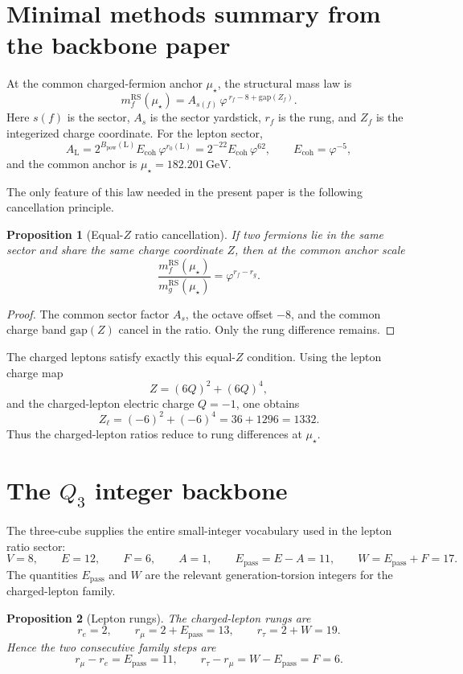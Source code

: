 \documentclass[11pt]{article}
\newtheorem{proposition}{Proposition}
\newcommand{\phig}{\varphi}
\newcommand{\mustar}{\mu_\star}
\newcommand{\Ecoh}{E_{\mathrm{coh}}}
\newcommand{\Epass}{E_{\mathrm{pass}}}
\newcommand{\Bpow}{B_{\mathrm{pow}}}
\begin{document}
\section{Minimal methods summary from the backbone paper}

At the common charged-fermion anchor \(\mustar\), the structural mass law is
\[
  m_f^{\mathrm{RS}}(\mustar)
  = A_{s(f)}\,\phig^{\,r_f - 8 + \mathrm{gap}(Z_f)}.
\]
Here \(s(f)\) is the sector, \(A_s\) is the sector yardstick, \(r_f\) is the rung, and \(Z_f\) is the integerized charge coordinate. For the lepton sector,
\[
A_{\mathrm{L}} = 2^{\Bpow(\mathrm{L})}\Ecoh\,\phig^{r_0(\mathrm{L})}
=2^{-22}\Ecoh\,\phig^{62},
\qquad
\Ecoh=\phig^{-5},
\]
and the common anchor is \(\mustar=182.201\,\mathrm{GeV}\).

The only feature of this law needed in the present paper is the following cancellation principle.

\begin{proposition}[Equal-\(Z\) ratio cancellation]
If two fermions lie in the same sector and share the same charge coordinate \(Z\), then at the common anchor scale
\[
\frac{m_f^{\mathrm{RS}}(\mustar)}{m_g^{\mathrm{RS}}(\mustar)}=\phig^{r_f-r_g}.
\]
\end{proposition}

\begin{proof}
The common sector factor \(A_s\), the octave offset \(-8\), and the common charge band \(\mathrm{gap}(Z)\) cancel in the ratio. Only the rung difference remains.
\end{proof}

The charged leptons satisfy exactly this equal-\(Z\) condition. Using the lepton charge map
\[
Z=(6Q)^2+(6Q)^4,
\]
and the charged-lepton electric charge \(Q=-1\), one obtains
\[
Z_\ell=(-6)^2+(-6)^4=36+1296=1332.
\]
Thus the charged-lepton ratios reduce to rung differences at \(\mustar\).

\section{The \(Q_3\) integer backbone}

The three-cube supplies the entire small-integer vocabulary used in the lepton ratio sector:
\[
V=8,
\qquad
E=12,
\qquad
F=6,
\qquad
A=1,
\qquad
\Epass=E-A=11,
\qquad
W=\Epass+F=17.
\]
The quantities \(\Epass\) and \(W\) are the relevant generation-torsion integers for the charged-lepton family.

\begin{proposition}[Lepton rungs]
The charged-lepton rungs are
\[
r_e=2,
\qquad
r_\mu=2+\Epass=13,
\qquad
r_\tau=2+W=19.
\]
Hence the two consecutive family steps are
\[
r_\mu-r_e=\Epass=11,
\qquad
r_\tau-r_\mu=W-\Epass=F=6.
\]
\end{proposition}
\end{document}
